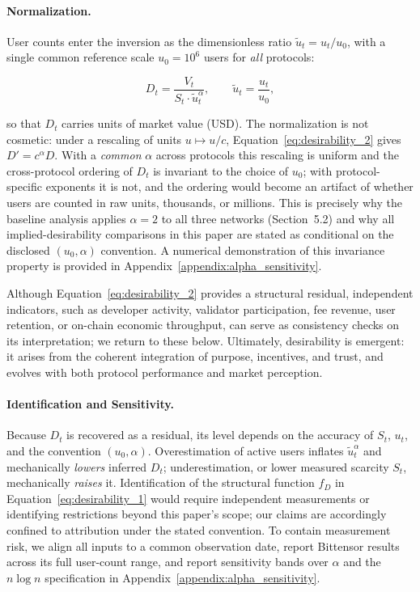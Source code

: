 \documentclass[12pt]{article}
\begin{document}
\paragraph{Normalization.}
User counts enter the inversion as the dimensionless ratio \( \tilde{u}_t = u_t / u_0 \), with a single common reference scale \( u_0 = 10^6 \) users for \emph{all} protocols:

\begin{equation}
D_t = \frac{V_t}{S_t \cdot \tilde{u}_t^{\alpha}}, \qquad \tilde{u}_t = \frac{u_t}{u_0},
\label{eq:desirability_2}
\end{equation}

\noindent so that \( D_t \) carries units of market value (USD). The normalization is not cosmetic: under a rescaling of units \( u \mapsto u/c \), Equation~\eqref{eq:desirability_2} gives \( D' = c^{\alpha} D \). With a \emph{common} \(\alpha\) across protocols this rescaling is uniform and the cross-protocol ordering of \( D_t \) is invariant to the choice of \( u_0 \); with protocol-specific exponents it is not, and the ordering would become an artifact of whether users are counted in raw units, thousands, or millions. This is precisely why the baseline analysis applies \( \alpha = 2 \) to all three networks (Section~5.2) and why all implied-desirability comparisons in this paper are stated as conditional on the disclosed \((u_0, \alpha)\) convention. A numerical demonstration of this invariance property is provided in Appendix~\ref{appendix:alpha_sensitivity}.

Although Equation~\eqref{eq:desirability_2} provides a structural residual, independent indicators, such as developer activity, validator participation, fee revenue, user retention, or on-chain economic throughput, can serve as consistency checks on its interpretation; we return to these below. Ultimately, desirability is emergent: it arises from the coherent integration of purpose, incentives, and trust, and evolves with both protocol performance and market perception.

\paragraph{Identification and Sensitivity.}
Because \( D_t \) is recovered as a residual, its level depends on the accuracy of \( S_t \), \( u_t \), and the convention \((u_0, \alpha)\). Overestimation of active users inflates \( \tilde{u}_t^\alpha \) and mechanically \emph{lowers} inferred \( D_t \); underestimation, or lower measured scarcity \( S_t \), mechanically \emph{raises} it. Identification of the structural function \( f_D \) in Equation~\eqref{eq:desirability_1} would require independent measurements or identifying restrictions beyond this paper's scope; our claims are accordingly confined to attribution under the stated convention. To contain measurement risk, we align all inputs to a common observation date, report Bittensor results across its full user-count range, and report sensitivity bands over \(\alpha\) and the \( n \log n \) specification in Appendix~\ref{appendix:alpha_sensitivity}.
\end{document}
